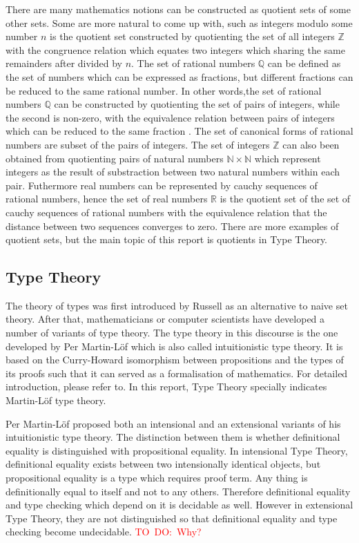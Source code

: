 \documentclass[envcountsame]{llncs}
\newcommand{\todo}[1]{\textcolor{red}{TO~DO:~#1}}
\newcommand{\N}{\mathbb{N}}
\newcommand{\Q}{\mathbb{Q}}
\newcommand{\R}{\mathbb{R}}
\newcommand{\Z}{\mathbb{Z}}
\newcommand{\itt}{intensional Type Theory}
\newcommand{\ett}{extensional Type Theory}
\newcommand{\mltt}{Martin-L\"{o}f type theory}
\begin{document}
There are many mathematics notions can be constructed as quotient sets
of some other sets. Some are more natural to come up with,
such as integers modulo some number
$n$ is the quotient set constructed by quotienting the set of all
integers $\Z$ with the congruence relation which equates two integers
which sharing the same remainders after divided by
$n$.
The set of rational numbers $\Q$ can be defined as the set of numbers
which can be expressed as fractions, but different fractions can be
reduced to the same rational number. In other words,the set of rational numbers $\Q$ can
be constructed by quotienting the set of pairs of integers, while the
second is non-zero, with the equivalence
relation between pairs of integers which can be reduced to the same fraction
. The set of canonical forms of rational numbers are subset of the
pairs of integers. 
The set of integers $\Z$ can also been obtained from quotienting pairs of natural numbers
$\N \times \N$ which represent integers as the result of substraction
between two natural numbers within each pair. Futhermore real
numbers can be represented by cauchy sequences of
rational numbers, hence the set of real numbers $\R$ is the quotient
set of the set of cauchy sequences of rational numbers with the
equivalence relation that the distance between two sequences converges
to zero. There are more examples of quotient sets, but the main
topic of this report is quotients in Type Theory. 

\subsection{Type Theory}

The theory of types was first introduced by Russell \cite{rus:1903} as
an alternative to naive set theory. After that, mathematicians or
computer scientists have developed a number of variants of type
theory. The type theory in this discourse is the one developed by Per
Martin-L\"{o}f \cite{per:71,per:82} which is also called
intuitionistic type theory. It is based on the Curry-Howard
isomorphism between propositions and the types of its proofs such that
it can served as a formalisation of mathematics. For detailed
introduction, please refer to\cite{nor:00}. In this report, Type
Theory specially indicates \mltt{}.


Per Martin-L\"{o}f proposed both an intensional and an extensional
variants of his intuitionistic type theory. The distinction between
them is whether definitional equality is distinguished with propositional equality. In \itt{}, definitional equality exists
between two intensionally identical objects, but propositional
equality is a type which requires proof term. Any thing is
definitionally equal to itself and not to any others. Therefore
definitional equality and type checking which
depend on it \cite{alt:99} is decidable as well. However
in \ett{}, they are not distinguished so that definitional equality
and type checking become undecidable.
\todo{Why?}
\end{document}
